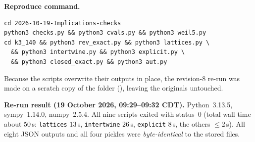\textbf{Reproduce command.}
\begin{verbatim}
cd 2026-10-19-Implications-checks
python3 checks.py && python3 cvals.py && python3 weil5.py
cd k3_140 && python3 rev_exact.py && python3 lattices.py \
  && python3 intertwine.py && python3 explicit.py \
  && python3 closed_exact.py && python3 aut.py
\end{verbatim}
Because the scripts overwrite their outputs in place, the revision-8 re-run was made on a scratch copy of the folder (), leaving the originals untouched.

\textbf{Re-run result (19 October 2026, 09:29--09:32 CDT).} Python~3.13.5, sympy~1.14.0, numpy~2.5.4. All nine scripts exited with status~$0$ (total wall time about $50$\,s: \texttt{lattices} $13$\,s, \texttt{intertwine} $26$\,s, \texttt{explicit} $8$\,s, the others $\le2$\,s). All eight JSON outputs and all four pickles were \emph{byte-identical} to the stored files.

